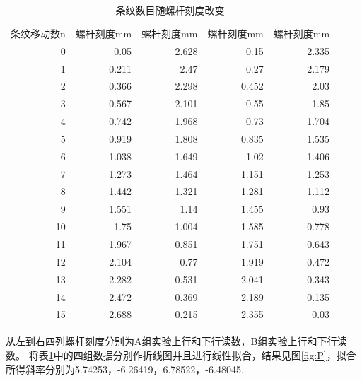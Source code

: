 \documentclass[10pt,a4paper,twoside,UTF8]{ctexart}
\begin{document}
\begin{table}[htbp]
	\centering
	\caption{条纹数目随螺杆刻度改变}
	  \begin{tabular}{rrrrr}
	  \multicolumn{1}{l}{条纹移动数n} & \multicolumn{1}{l}{螺杆刻度mm} & \multicolumn{1}{l}{螺杆刻度mm} & \multicolumn{1}{l}{螺杆刻度mm} & \multicolumn{1}{l}{螺杆刻度mm} \\
	  0     & 0.05  & 2.628 & 0.15  & 2.335 \\
	  1     & 0.211 & 2.47  & 0.27  & 2.179 \\
	  2     & 0.366 & 2.298 & 0.452 & 2.03 \\
	  3     & 0.567 & 2.101 & 0.55  & 1.85 \\
	  4     & 0.742 & 1.968 & 0.73  & 1.704 \\
	  5     & 0.919 & 1.808 & 0.835 & 1.535 \\
	  6     & 1.038 & 1.649 & 1.02  & 1.406 \\
	  7     & 1.273 & 1.464 & 1.151 & 1.253 \\
	  8     & 1.442 & 1.321 & 1.281 & 1.112 \\
	  9     & 1.551 & 1.14  & 1.455 & 0.93 \\
	  10    & 1.75  & 1.004 & 1.585 & 0.778 \\
	  11    & 1.967 & 0.851 & 1.751 & 0.643 \\
	  12    & 2.104 & 0.77  & 1.919 & 0.472 \\
	  13    & 2.282 & 0.531 & 2.041 & 0.343 \\
	  14    & 2.472 & 0.369 & 2.189 & 0.135 \\
	  15    & 2.688 & 0.215 & 2.355 & 0.03 \\
	  \end{tabular}%
	\label{tab:P}%
  \end{table}%

从左到右四列螺杆刻度分别为A组实验上行和下行读数，B组实验上行和下行读数。
将表\ref{tab:P}中的四组数据分别作折线图并且进行线性拟合，结果见图\ref{fig:P}，拟合所得斜率分别为5.74253，-6.26419，6.78522，-6.48045.
\end{document}
